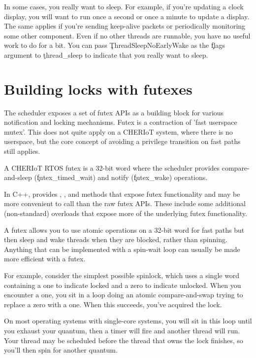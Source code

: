 In some cases, you really want to sleep.
For example, if you're updating a clock display, you will want to run once a second or once a minute to update a display.
The same applies if you're sending keep-alive packets or periodically monitoring some other component.
Even if no other threads are runnable, you have no useful work to do for a bit.
You can pass \c{ThreadSleepNoEarlyWake} as the \c{flags} argument to \c{thread_sleep} to indicate that you really want to sleep.

\section[label=futex]{Building locks with futexes}

The scheduler exposes a set of futex APIs as a building block for various notification and locking mechanisms.
Futex is a contraction of 'fast userspace mutex'.
This does not quite apply on a CHERIoT system, where there is no userspace, but the core concept of avoiding a privilege transition on fast paths still applies.

A CHERIoT RTOS futex is a 32-bit word where the scheduler provides compare-and-sleep (\c{futex_timed_wait}) and notify (\c{futex_wake}) operations.



\begin{note}
	In C++,  provides , , and  methods that expose futex functionality and may be more convenient to call than the raw futex APIs.
	These include some additional (non-standard) overloads that expose more of the underlying futex functionality.
\end{note}

A futex allows you to use atomic operations on a 32-bit word for fast paths but then sleep and wake threads when they are blocked, rather than spinning.
Anything that can be implemented with a spin-wait loop can usually be made more efficient with a futex.

For example, consider the simplest possible spinlock, which uses a single word containing a one to indicate locked and a zero to indicate unlocked.
When you encounter a one, you sit in a loop doing an atomic compare-and-swap trying to replace a zero with a one.
When this succeeds, you've acquired the lock.

On most operating systems with single-core systems, you will sit in this loop until you exhaust your quantum, then a timer will fire and another thread will run.
Your thread may be scheduled before the thread that owns the lock finishes, so you'll then spin for another quantum.

